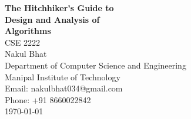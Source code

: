 \newcommand{\titlepagebreak}{\\[1em]}
\begin{titlepage}
    \vspace*{\fill} %

    \centering
    {\Huge \bfseries The Hitchhiker's Guide to\titlepagebreak{} Design and Analysis of \titlepagebreak{} Algorithms}\\[1in]
    
    {\Large CSE 2222}\\[0.75in]
    
    {\huge Nakul Bhat}\\[0.5in]
    
    {\large Department of Computer Science and Engineering \titlepagebreak{} Manipal Institute of Technology}\\[0.5in]
    
    {\large Email: nakulbhat034@gmail.com \titlepagebreak{} Phone: +91 8660022842}\\[1.5cm]
    
    {\large \today}\\[0.5cm]
    
    \vspace*{\fill} %
\end{titlepage}
\restoregeometry{}